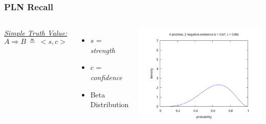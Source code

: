 \documentclass[aspectratio=169]{beamer}
\newcommand{\limp}{\Rightarrow}
\newcommand{\STV}[2]{<\!#1, #2\!>}
\begin{document}
\begin{frame}
  \frametitle{PLN Recall}
  \begin{columns}
    \column{5cm}
    \underline{\emph{Simple Truth Value:}}
    $$A \limp B\ \measeq\ \STV{s}{c}$$
    \begin{itemize}
    \item $s$ = \emph{strength}
    \item $c$ = \emph{confidence}
    \item Beta Distribution
    \end{itemize}
    \column{10cm}
    \includegraphics[scale=0.4]{figs/observations_2_4.png}
  \end{columns}
\end{frame}
\end{document}
